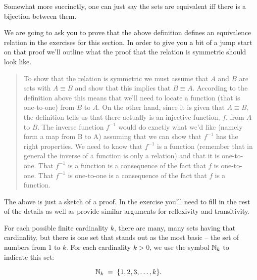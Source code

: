 Somewhat more succinctly, one can just say the sets are equivalent iff
there is a bijection between them.

We are going to ask you to prove that the above definition defines an
equivalence relation in the exercises for this section.  In order to give you a
bit of a jump start on that proof we'll outline what the proof that the relation
is symmetric should look like.

\begin{quote}
To show that the relation is symmetric we must assume that $A$
and $B$ are sets with $A \equiv B$ and show that this implies that
$B \equiv A$.  According to the definition above this means that we'll
need to locate a function (that is one-to-one) from $B$ to $A$.  On
the other hand, since it is given that $A \equiv B$, the definition tells
us that there actually is an injective function, $f$, from $A$ to $B$.
The inverse function $f^{-1}$ would do exactly what we'd like (namely
form a map from B to A) assuming that we can show that $f^{-1}$
has the right properties.  We need to know that $f^{-1}$ is a function
(remember that in general the inverse of a function is only a
relation) and that it is one-to-one.  That $f^{-1}$ is a function is a
consequence of the fact that $f$ is one-to-one.  That $f^{-1}$ is one-to-one
is a consequence of the fact that $f$ is a function.
\end{quote}

The above is just a sketch of a proof.  In the exercise you'll need to fill
in the rest of the details as well as provide similar arguments for reflexivity
and transitivity.

For each possible finite cardinality $k$, there are many, many sets having
that cardinality, but there is one set that stands out as the most basic -- the
set of numbers from $1$ to $k$.  For each cardinality $k > 0$, we use the symbol
${\mathbb N}_k$ to indicate this set:

\[ {\mathbb N}_k \; = \; \{1, 2, 3, \ldots , k\}. \]

